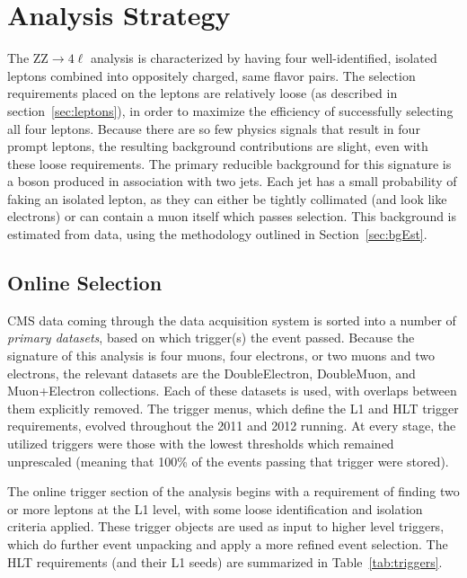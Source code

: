 \chapter{Analysis Strategy}
\label{chapter:analysis}
The ZZ$\rightarrow 4\ell$ analysis is characterized by having four
well-identified, isolated leptons combined into oppositely charged, same flavor
pairs. The selection requirements placed on the leptons are relatively loose
(as described in section~\ref{sec:leptons}), in order to maximize the efficiency
of successfully selecting all four leptons.  Because there are so few physics
signals that result in four prompt leptons, the resulting background
contributions are slight, even with these loose requirements. The primary
reducible background for this signature is a \Z boson produced in association
with two jets. Each jet has a small probability of faking an isolated lepton, as
they can either be tightly collimated (and look like electrons) or can contain a
muon itself which passes selection. This background is estimated from data,
using the methodology outlined in Section~\ref{sec:bgEst}.


\section{Online Selection}
CMS data coming through the data acquisition system is sorted into a number of
\emph{primary datasets}, based on which trigger(s) the event passed. Because the
signature of this analysis is four muons, four electrons, or two muons and two
electrons, the relevant datasets are the DoubleElectron, DoubleMuon, and
Muon+Electron collections. Each of these datasets is used, with overlaps between
them explicitly removed. The trigger menus, which define the L1 and HLT trigger
requirements, evolved throughout the 2011 and 2012 running. At every stage, the
utilized triggers were those with the lowest thresholds which remained
unprescaled (meaning that 100\% of the events passing that trigger were stored).

The online trigger section of the analysis begins with a requirement of finding
two or more leptons at the L1 level, with some loose identification and
isolation criteria applied. These trigger objects are used as input to higher
level triggers, which do further event unpacking and apply a more refined event
selection. The HLT requirements (and their L1 seeds) are summarized in
Table~\ref{tab:triggers}.

